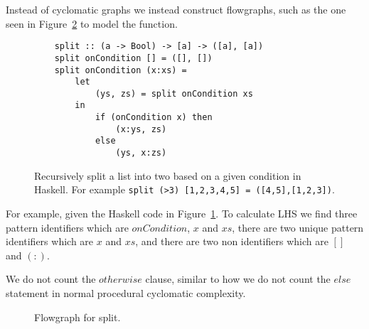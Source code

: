 \documentclass[12pt]{article}
\theoremstyle{definition}
\theoremstyle{theorem}
\begin{document}
Instead of cyclomatic graphs we instead construct flowgraphs, such as the one
seen in Figure~\ref{fig:cyclomaticfunctional} to model the function.

\begin{figure}[H]
    \begin{lstlisting}
    split :: (a -> Bool) -> [a] -> ([a], [a])
    split onCondition [] = ([], [])
    split onCondition (x:xs) =
        let 
            (ys, zs) = split onCondition xs
        in 
            if (onCondition x) then 
                (x:ys, zs)
            else 
                (ys, x:zs)
    \end{lstlisting}
    \caption{Recursively split a list into two based on a given condition in
    Haskell. For example \texttt{split (>3) [1,2,3,4,5] =
    ([4,5],[1,2,3])}.}\label{fig:split}
\end{figure}

For example, given the Haskell code in Figure~\ref{fig:split}. To calculate LHS
we find three pattern identifiers which are $onCondition$, $x$ and $xs$, there
are two unique pattern identifiers which are $x$ and $xs$, and there are two non
identifiers which are $[]$ and $(:)$.

We do not count the $otherwise$ clause, similar to how we do not count the
$else$ statement in normal procedural cyclomatic complexity.~\cite{bergklaas}


\begin{figure}[H]
    \centering
    \label{fig:cyclomaticfunctional}
    \caption{Flowgraph for split.}
\end{figure}
\end{document}
